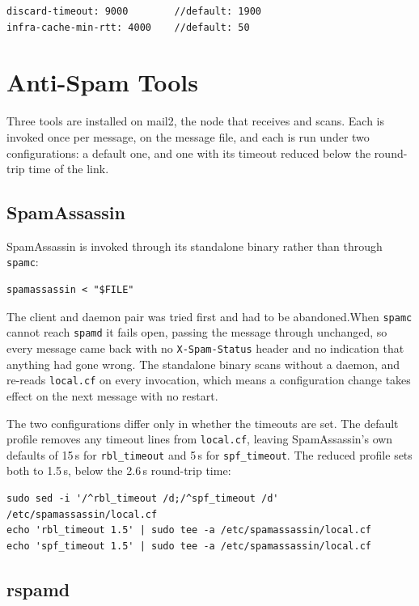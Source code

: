 \begin{lstlisting}
discard-timeout: 9000        //default: 1900
infra-cache-min-rtt: 4000    //default: 50
\end{lstlisting}

\section{Anti-Spam Tools}

Three tools are installed on mail2, the node that receives and scans. Each is
invoked once per message, on the message file, and each is run under two
configurations: a default one, and one with its timeout reduced below the round-trip
time of the link.

\subsection{SpamAssassin}

SpamAssassin is invoked through its standalone binary rather than through
\texttt{spamc}:

\begin{lstlisting}
spamassassin < "$FILE"
\end{lstlisting}

The client and daemon pair was tried first and had to be abandoned.When
\texttt{spamc} cannot reach \texttt{spamd} it fails open, passing the message through
unchanged, so every message came back with no \texttt{X-Spam-Status} header and no
indication that anything had gone wrong. The standalone binary scans without a
daemon, and re-reads \texttt{local.cf} on every invocation, which means a
configuration change takes effect on the next message with no restart.

The two configurations differ only in whether the timeouts are set. The default
profile removes any timeout lines from \texttt{local.cf}, leaving SpamAssassin's own
defaults of 15\,s for \texttt{rbl\_timeout} and 5\,s for \texttt{spf\_timeout}. The
reduced profile sets both to 1.5\,s, below the 2.6\,s round-trip time:

\begin{lstlisting}
sudo sed -i '/^rbl_timeout /d;/^spf_timeout /d' /etc/spamassassin/local.cf
echo 'rbl_timeout 1.5' | sudo tee -a /etc/spamassassin/local.cf
echo 'spf_timeout 1.5' | sudo tee -a /etc/spamassassin/local.cf
\end{lstlisting}

\subsection{rspamd}


